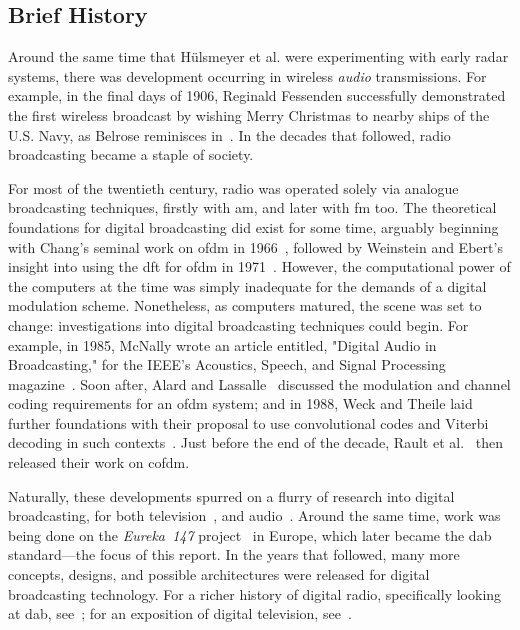 \documentclass[class=report,11pt,crop=false]{standalone}
\begin{document}
\subsection{Brief History}
Around the same time that H\"ulsmeyer et al. were experimenting with early radar systems, there was development occurring in wireless \emph{audio} transmissions. For example, in the final days of 1906, Reginald Fessenden successfully demonstrated the first wireless broadcast by wishing Merry Christmas to nearby ships of the U.S. Navy, as Belrose reminisces in~\cite{Belrose2012}. In the decades that followed, radio broadcasting became a staple of society.

For most of the twentieth century, radio was operated solely via analogue broadcasting techniques, firstly with \gls{am}, and later with \gls{fm} too. The theoretical foundations for digital broadcasting did exist for some time, arguably beginning with Chang's seminal work on \gls{ofdm} in 1966~\cite{Chang1966}, followed by Weinstein and Ebert's insight into using the \gls{dft} for \gls{ofdm} in 1971~\cite{Weinstein1971}. However, the computational power of the computers at the time was simply inadequate for the demands of a digital modulation scheme. Nonetheless, as computers matured, the scene was set to change: investigations into digital broadcasting techniques could begin. For example, in 1985, McNally wrote an article entitled, "Digital Audio in Broadcasting," for the IEEE's Acoustics, Speech, and Signal Processing magazine~\cite{McNally1985}. Soon after, Alard and Lassalle~\cite{lassalle1987principles, Alard1988} discussed the modulation and channel coding requirements for an \gls{ofdm} system; and in 1988, Weck and Theile laid further foundations with their proposal to use convolutional codes and Viterbi decoding in such contexts~\cite{weck1988dab}. Just before the end of the decade, Rault et al.~\cite{Raulta} then released their work on \gls{cofdm}.

Naturally, these developments spurred on a flurry of research into digital broadcasting, for both television~\cite{Bernard1992, stare1992}, and audio~\cite{shelswell1991, Price1992, Maddocks1992}. Around the same time, work was being done on the \emph{Eureka~147} project~\cite{Halliera} in Europe, which later became the \gls{dab} standard---the focus of this report. In the years that followed, many more concepts, designs, and possible architectures were released for digital broadcasting technology. For a richer history of digital radio, specifically looking at \gls{dab}, see~\cite{ONeill2009}; for an exposition of digital television, see~\cite{Wu2006}.
\end{document}
